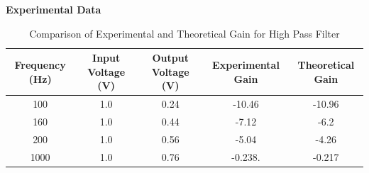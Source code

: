 \documentclass{article}
\begin{document}
\textbf{Experimental Data}
\begin{table}[H]
    \centering
    \begin{tabular}{|c|c|c|c|c|}
        \hline
        Frequency (Hz) & Input Voltage (V) & Output Voltage (V) & Experimental Gain & Theoretical Gain\\
        \hline
        100 & 1.0 & 0.24 & -10.46 & -10.96 \\
        160 & 1.0 & 0.44 & -7.12 & -6.2 \\
        200 & 1.0 & 0.56 & -5.04 & -4.26 \\
        1000 & 1.0 & 0.76 & -0.238. & -0.217 \\
        \hline
    \end{tabular}
    \caption{Comparison of Experimental and Theoretical Gain for High Pass Filter}
    \label{tab:exp_data}
\end{table}
\begin{figure}[H]
    \centering
    \hfill
\end{figure}
\begin{figure}[H]
    \centering
    \hfill
\end{figure}
\end{document}
